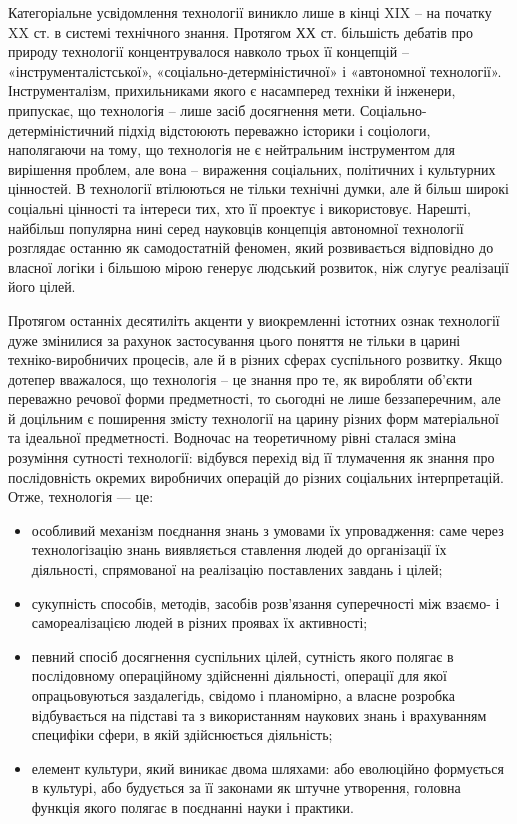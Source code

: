 Категоріальне усвідомлення технології виникло лише в кінці XIX – на
початку XX ст. в системі технічного знання. Протягом ХХ ст. більшість дебатів
про природу технології концентрувалося навколо трьох її концепцій –
«інструменталістської», «соціально-детерміністичної» і «автономної
технології». Інструменталізм, прихильниками якого є насамперед техніки й
інженери, припускає, що технологія – лише засіб досягнення мети. Соціально-
детерміністичний підхід відстоюють переважно історики і соціологи,
наполягаючи на тому, що технологія не є нейтральним інструментом для
вирішення проблем, але вона – вираження соціальних, політичних і культурних
цінностей. В технології втілюються не тільки технічні думки, але й більш
широкі соціальні цінності та інтереси тих, хто її проектує і використовує.
Нарешті, найбільш популярна нині серед науковців концепція автономної
технології розглядає останню як самодостатній феномен, який розвивається
відповідно до власної логіки і більшою мірою генерує людський розвиток, ніж
слугує реалізації його цілей.

Протягом останніх десятиліть акценти у виокремленні істотних ознак
технології дуже змінилися за рахунок застосування цього поняття не тільки в
царині техніко-виробничих процесів, але й в різних сферах суспільного
розвитку. Якщо дотепер вважалося, що технологія – це знання про те, як
виробляти об’єкти переважно речової форми предметності, то сьогодні не лише
беззаперечним, але й доцільним є поширення змісту технології на царину
різних форм матеріальної та ідеальної предметності. Водночас на теоретичному
рівні сталася зміна розуміння сутності технології: відбувся перехід від її
тлумачення як знання про послідовність окремих виробничих операцій до
різних соціальних інтерпретацій. Отже, технологія --- це:

\begin{itemize}
	\item особливий механізм поєднання знань з умовами їх упровадження: саме
	через технологізацію знань виявляється ставлення людей до організації їх
	діяльності, спрямованої на реалізацію поставлених завдань і цілей;
	
	\item сукупність способів, методів, засобів розв’язання суперечності між
	взаємо- і самореалізацією людей в різних проявах їх активності;

	\item певний спосіб досягнення суспільних цілей, сутність якого полягає в
	послідовному операційному здійсненні діяльності, операції для якої
	опрацьовуються заздалегідь, свідомо і планомірно, а власне розробка
	відбувається на підставі та з використанням наукових знань і врахуванням
	специфіки сфери, в якій здійснюється діяльність;

	\item елемент культури, який виникає двома шляхами: або еволюційно
	формується в культурі, або будується за її законами як штучне утворення,
	головна функція якого полягає в поєднанні науки і практики.
\end{itemize}

